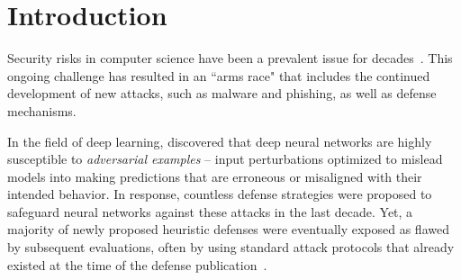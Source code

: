 \section{Introduction}





Security risks in computer science have been a prevalent issue for decades~\cite{valiant_learning_1985, kearns_learning_1993}. %
This ongoing challenge has resulted in an ``arms race" that includes the continued development of new attacks, such as malware and phishing, as well as defense mechanisms. %

In the field of deep learning, \citet{szegedy_intriguing_2014} discovered that deep neural networks are highly susceptible to \textit{adversarial examples} -- input perturbations optimized to mislead models into making predictions that are erroneous or misaligned with their intended behavior. In response, countless defense strategies were proposed to safeguard neural networks against these attacks in the last decade. Yet, a majority of newly proposed heuristic defenses were eventually exposed as flawed by subsequent evaluations, often by using standard attack protocols that already existed at the time of the defense publication~\citep{tramer_adaptive_2020}. 

